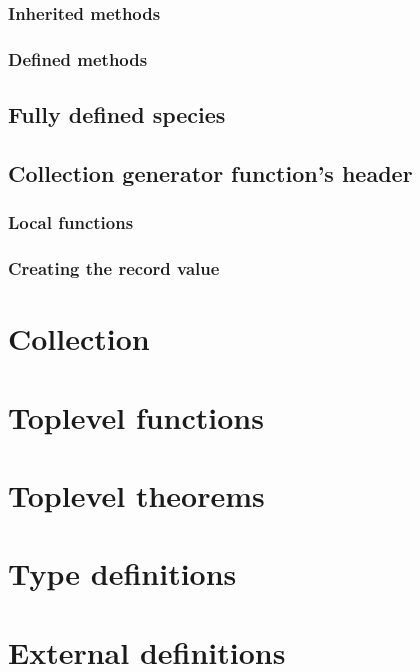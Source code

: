 \subsubsection{Inherited methods}
\subsubsection{Defined methods}
\subsection{Fully defined species}
\subsection{Collection generator function's header}
\subsubsection{Local functions}
\subsubsection{Creating the record value}
\section{Collection}
\section{Toplevel functions}
\section{Toplevel theorems}
\section{Type definitions}
\section{External definitions}
